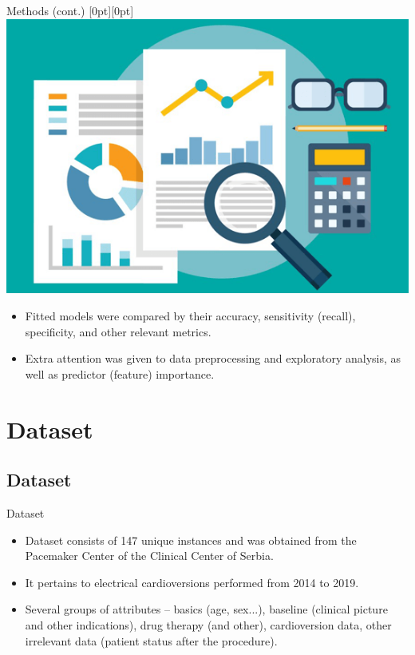 \documentclass[hyperref={bookmarks=false}]{beamer}
\newcommand{\lenitem}[2][.51\linewidth]{\parbox[t]{#1}{\strut #2\strut}}
\begin{document}
\begin{frame}{Methods (cont.)}
\mbox{}\hfill\raisebox{-\height}[0pt][0pt]{\includegraphics[width=.42\linewidth]{data.png}}
\vspace*{-\baselineskip}

\begin{itemize}
    \item \lenitem{Fitted models were compared by their accuracy, sensitivity (recall), specificity, and other relevant metrics.}
    \item \lenitem{Extra attention was given to data preprocessing and exploratory analysis, as well as predictor (feature) importance.}
\end{itemize}
\end{frame}

\section{Dataset}
\subsection{Dataset}
\begin{frame}{Dataset}
\begin{itemize}
    \item Dataset consists of 147 unique instances and was obtained from the Pacemaker Center of the Clinical Center of Serbia.

    \item It pertains to electrical cardioversions performed from 2014 to 2019.

    \item Several groups of attributes -- basics (age, sex...), baseline (clinical picture and other indications), drug therapy (and other), cardioversion data, other irrelevant data (patient status after the procedure).
\end{itemize}
\end{frame}
\end{document}
